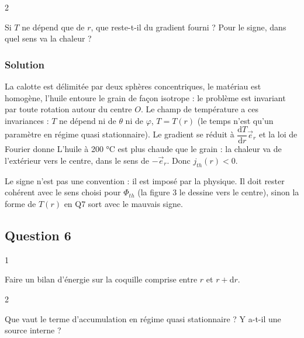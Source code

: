 \documentclass[11pt,a4paper]{article}
\newcommand{\equationajustee}[1]{%
  \sbox{\boiteequation}{$\displaystyle #1$}%
  \ifdim\wd\boiteequation>\linewidth
    \[\resizebox{\linewidth}{!}{\usebox{\boiteequation}}\]%
  \else
    \[#1\]%
  \fi}
\begin{document}
\begin{indication}{2}

Si \(T\) ne dépend que de \(r\), que reste-t-il du gradient fourni ? Pour le signe, dans quel sens va la chaleur ?

\end{indication}

\hypertarget{solution-4}{%
\subsubsection{Solution}\label{solution-4}}

La calotte est délimitée par deux sphères concentriques, le matériau est homogène, l'huile entoure le grain de façon isotrope : le problème est invariant par toute rotation autour du centre \(O\). Le champ de température a ces invariances : \(T\) ne dépend ni de \(\theta\) ni de \(\varphi\), \(T=T(r)\) (le temps n'est qu'un paramètre en régime quasi stationnaire). Le gradient se réduit à \(\dfrac{\mathrm dT}{\mathrm dr}\vec e_r\) et la loi de Fourier donne
\equationajustee{\boxed{\vec j_{th}=-\lambda\frac{\mathrm dT}{\mathrm dr}\,\vec e_r=j_{th}(r)\,\vec e_r}}
L'huile à 200 °C est plus chaude que le grain : la chaleur va de l'extérieur vers le centre, dans le sens de \(-\vec e_r\). Donc \(\boxed{j_{th}(r)<0}\).

\begin{piege}

Le signe n'est pas une convention : il est imposé par la physique. Il doit rester cohérent avec le sens choisi pour \(\Phi_{th}\) (la figure 3 le dessine vers le centre), sinon la forme de \(T(r)\) en Q7 sort avec le mauvais signe.

\end{piege}

\hypertarget{question-6}{%
\subsection{Question 6}\label{question-6}}

\begin{indication}{1}

Faire un bilan d'énergie sur la coquille comprise entre \(r\) et \(r+\mathrm dr\).

\end{indication}

\begin{indication}{2}

Que vaut le terme d'accumulation en régime quasi stationnaire ? Y a-t-il une source interne ?

\end{indication}
\end{document}
